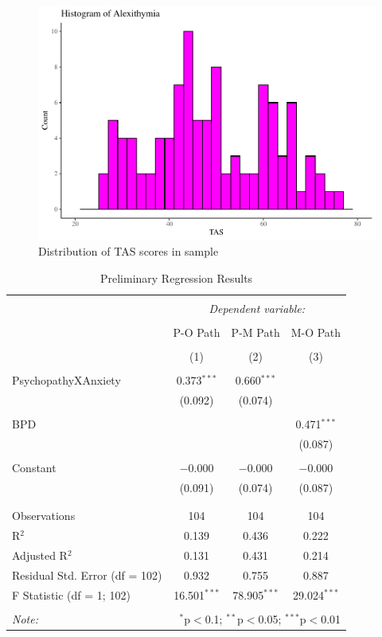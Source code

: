 \documentclass[
  man,floatsintext]{apa7}
\begin{document}
\begin{figure}
\includegraphics[width=1\linewidth]{d2m-Psychopathy_files/figure-latex/TAS-descriptives-1} \caption{Distribution of TAS scores in sample}\label{fig:TAS-descriptives-appendix}
\end{figure}

\begin{table}[!htbp] \centering 
  \caption{Preliminary Regression Results} 
  \label{tab:prelim-regression-output} 
\begin{tabular}{@{\extracolsep{1pt}}lccc} 
\\[-1.8ex]\hline 
\hline \\[-1.8ex] 
 & \multicolumn{3}{c}{\textit{Dependent variable:}} \\ 
\cline{2-4} 
\\[-1.8ex] & P-O Path & P-M Path & M-O Path \\ 
\\[-1.8ex] & (1) & (2) & (3)\\ 
\hline \\[-1.8ex] 
 PsychopathyXAnxiety & 0.373$^{***}$ & 0.660$^{***}$ &  \\ 
  & (0.092) & (0.074) &  \\ 
  & & & \\ 
 BPD &  &  & 0.471$^{***}$ \\ 
  &  &  & (0.087) \\ 
  & & & \\ 
 Constant & $-$0.000 & $-$0.000 & $-$0.000 \\ 
  & (0.091) & (0.074) & (0.087) \\ 
  & & & \\ 
\hline \\[-1.8ex] 
Observations & 104 & 104 & 104 \\ 
R$^{2}$ & 0.139 & 0.436 & 0.222 \\ 
Adjusted R$^{2}$ & 0.131 & 0.431 & 0.214 \\ 
Residual Std. Error (df = 102) & 0.932 & 0.755 & 0.887 \\ 
F Statistic (df = 1; 102) & 16.501$^{***}$ & 78.905$^{***}$ & 29.024$^{***}$ \\ 
\hline 
\hline \\[-1.8ex] 
\textit{Note:}  & \multicolumn{3}{r}{$^{*}$p$<$0.1; $^{**}$p$<$0.05; $^{***}$p$<$0.01} \\ 
\end{tabular} 
\end{table}
\end{document}
